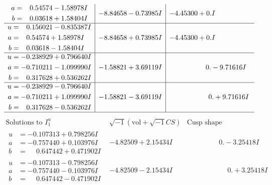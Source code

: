 \documentclass[1p]{elsarticle_modified}
\theoremstyle{definition}
\newcommand{\I}{\sqrt{-1}}
\begin{document}
$$\begin{array}{c|c|c}
\begin{aligned}
a &= \phantom{-}0.54574 - 1.58978 I \\
b &= \phantom{-}0.03618 + 1.58404 I\end{aligned}
 & -8.84658 - 0.73985 I & -4.45300 + 0. I\phantom{ +0.000000I} \\ \hline\begin{aligned}
u &= \phantom{-}0.156021 - 0.835387 I \\
a &= \phantom{-}0.54574 + 1.58978 I \\
b &= \phantom{-}0.03618 - 1.58404 I\end{aligned}
 & -8.84658 + 0.73985 I & -4.45300 + 0. I\phantom{ +0.000000I} \\ \hline\begin{aligned}
u &= -0.238929 + 0.796640 I \\
a &= -0.710211 - 1.099990 I \\
b &= \phantom{-}0.317628 + 0.536262 I\end{aligned}
 & -1.58821 + 3.69119 I & \phantom{-0.000000 } 0. - 9.71616 I \\ \hline\begin{aligned}
u &= -0.238929 - 0.796640 I \\
a &= -0.710211 + 1.099990 I \\
b &= \phantom{-}0.317628 - 0.536262 I\end{aligned}
 & -1.58821 - 3.69119 I & \phantom{-0.000000 -}0. + 9.71616 I\\
 \hline 
 \end{array}$$\newpage$$\begin{array}{c|c|c}  
\text{Solutions to }I^u_{1}& \I (\text{vol} + \sqrt{-1}CS) & \text{Cusp shape}\\
 \hline 
\begin{aligned}
u &= -0.107313 + 0.798256 I \\
a &= -0.757440 + 0.103976 I \\
b &= \phantom{-}0.647442 + 0.471902 I\end{aligned}
 & -4.82509 + 2.15434 I & \phantom{-0.000000 } 0. - 3.25418 I \\ \hline\begin{aligned}
u &= -0.107313 - 0.798256 I \\
a &= -0.757440 - 0.103976 I \\
b &= \phantom{-}0.647442 - 0.471902 I\end{aligned}
 & -4.82509 - 2.15434 I & \phantom{-0.000000 -}0. + 3.25418 I \\ \hline\begin{aligned}

\end{aligned}
\end{array}$$
\end{document}
